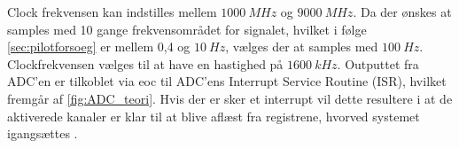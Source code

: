 Clock frekvensen kan indstilles mellem $1000~MHz$ og $9000~MHz$.\citep{ADC2014} Da der ønskes at samples med 10 gange frekvensområdet for signalet, hvilket i følge  \autoref{sec:pilotforsoeg} er mellem 0,4 og $10~Hz$, vælges der at samples med $100~Hz$. Clockfrekvensen vælges til at have en hastighed på $1600~kHz$. Outputtet fra ADC'en er tilkoblet via eoc til ADC'ens Interrupt Service Routine (ISR), hvilket fremgår af \autoref{fig:ADC_teori}. Hvis der er sker et interrupt vil dette resultere i at de aktiverede kanaler er klar til at blive aflæst fra registrene, hvorved systemet igangsættes \citep{ADC2014}.


